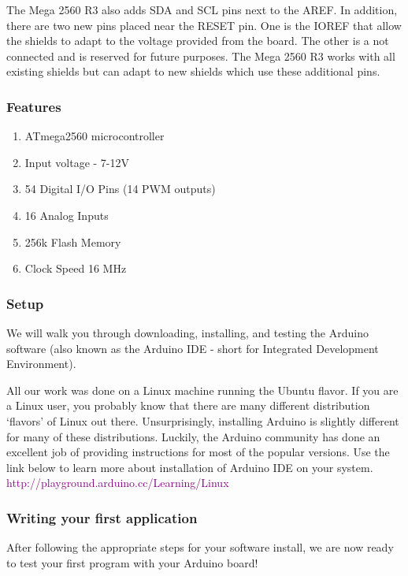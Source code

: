 \documentclass[a4paper,12pt]{article}
\begin{document}
The Mega 2560 R3 also adds SDA and SCL pins next to the AREF. In addition, there are two new pins placed near the RESET pin. 
One is the IOREF that allow the shields to adapt to the voltage provided from the board. The other is a not connected and is 
reserved for future purposes. The Mega 2560 R3 works with all existing shields but can adapt to new shields which use these 
additional pins.

\subsubsection*{Features}
\begin{enumerate}
	\item ATmega2560 microcontroller 
	\item Input voltage - 7-12V 
	\item 54 Digital I/O Pins (14 PWM outputs) 
	\item 16 Analog Inputs 
	\item 256k Flash Memory 
	\item  Clock Speed 16 MHz
\end{enumerate}

\subsubsection*{Setup}
We will walk you through downloading, installing, and testing the Arduino software 
(also known as the Arduino IDE - short for Integrated Development Environment).

All our work was done on a Linux machine running the Ubuntu flavor.
If you are a Linux user, you probably know that there are many different distribution ‘flavors’ of Linux out there. 
Unsurprisingly, installing Arduino is slightly different for many of these distributions. Luckily, the Arduino community 
has done an excellent job of providing instructions for most of the popular versions. Use the link below to learn more about installation
of Arduino IDE on your system.
\newline \textcolor{purple}{http://playground.arduino.cc/Learning/Linux}

\subsubsection*{Writing your first application}
After following the appropriate steps for your software install, we are now ready to test your first program with your Arduino board!
\end{document}
